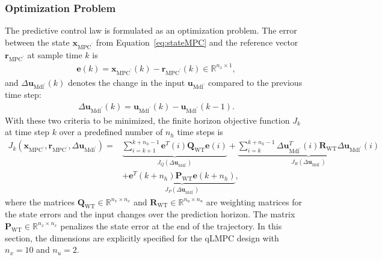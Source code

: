 \subsubsection{Optimization Problem}
The predictive control law is formulated as an optimization problem. The error between the state \( \bm{x}_{\text{MPC}^\prime} \) from Equation~\eqref{eq:stateMPC} and the reference vector $\bm{r}_{\text{MPC}^\prime}$ at sample time \( k \) is
\begin{align*}
    \bm{e}(k) = \bm{x}_{\text{MPC}^\prime}(k) - \bm{r}_{\text{MPC}^\prime}(k) \in \mathbb{R}^{n_x \times 1},
\end{align*}
and $\Delta \bm{u}_{\text{Mdl}^\prime}(k)$ denotes the change in the input $\bm{u}_{\text{Mdl}^\prime}$ compared to the previous time step:
\begin{align*}
    \Delta \bm{u}_{\text{Mdl}^\prime}(k) = \bm{u}_{\text{Mdl}^\prime}(k) - \bm{u}_{\text{Mdl}^\prime}(k-1).
\end{align*}
%
With these two criteria to be minimized, the finite horizon objective function \( J_k \) at time step \( k \) over a predefined number of \( n_h \) time steps is
\begin{align*}
    J_k(\bm{x}_{\text{MPC}^\prime}, \bm{r}_{\text{MPC}^\prime}, \Delta \bm{u}_{\text{Mdl}^\prime}) = & \underbrace{ \sum_{i=k+1}^{k+n_h-1} \bm{e}^T(i) \bm{Q}_{\text{WT}} \bm{e}(i)}_{J_Q(\Delta \bm{u}_{\text{Mdl}^\prime})} + \underbrace{\sum_{i=k}^{k+n_h-1} \Delta \bm{u}^T_{\text{Mdl}^\prime}(i) \bm{R}_{\text{WT}} \Delta \bm{u}_{\text{Mdl}^\prime}(i)}_{J_R(\Delta \bm{u}_{\text{Mdl}^\prime})} \\
    &+ \underbrace{\bm{e}^T(k+n_h) \bm{P}_{\text{WT}} \bm{e}(k+n_h)}_{J_P(\Delta \bm{u}_{\text{Mdl}^\prime})},
\end{align*}
where the matrices \( \bm{Q}_{\text{WT}} \in \mathbb{R}^{n_x \times n_x} \) and \( \bm{R}_{\text{WT}} \in \mathbb{R}^{n_u \times n_u} \) are weighting matrices for the state errors and the input changes over the prediction horizon. The matrix \( \bm{P}_{\text{WT}} \in \mathbb{R}^{n_x \times n_x} \) penalizes the state error at the end of the trajectory. In this section, the dimensions are explicitly specified for the qLMPC design with \( n_x = 10 \) and \( n_u = 2 \).

